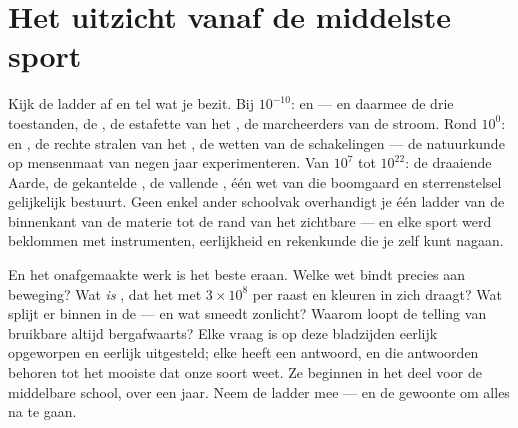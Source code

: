 \section{Het uitzicht vanaf de middelste sport}

\begin{remark}\label{rem:g9:atoms-to-galaxies:built}
Kijk de ladder af en tel wat je bezit. Bij $10^{-10}$:
 en  --- en daarmee de drie
toestanden, de , de estafette van het
, de marcheerders van de stroom. Rond $10^{0}$:
 en , de rechte stralen van het
, de wetten van de schakelingen --- de natuurkunde op
mensenmaat van negen jaar experimenteren. Van $10^{7}$ tot $10^{22}$:
de draaiende Aarde, de gekantelde , de vallende
, één wet van  die boomgaard en
sterrenstelsel gelijkelijk bestuurt. Geen enkel ander schoolvak
overhandigt je één ladder van de binnenkant van de materie tot de rand
van het zichtbare --- en elke sport werd beklommen met instrumenten,
eerlijkheid en rekenkunde die je zelf kunt nagaan.
\end{remark}

\begin{remark}\label{rem:g9:atoms-to-galaxies:ahead}
En het onafgemaakte werk is het beste eraan. Welke wet bindt
 precies aan beweging? Wat \emph{is}
, dat het met $3 \times 10^{8}$  per
 raast en kleuren in zich draagt? Wat splijt er binnen in de
 --- en wat smeedt zonlicht? Waarom loopt de telling van
bruikbare  altijd bergafwaarts? Elke vraag is op deze
bladzijden eerlijk opgeworpen en eerlijk uitgesteld; elke heeft een
antwoord, en die antwoorden behoren tot het mooiste dat onze soort weet.
Ze beginnen in het deel voor de middelbare school, over een jaar. Neem
de ladder mee --- en de gewoonte om alles na te gaan.
\end{remark}

